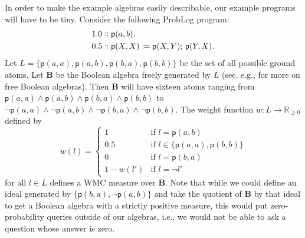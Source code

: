 \documentclass{article}
\theoremstyle{definition}
\theoremstyle{remark}
\begin{document}
In order to make the example algebras easily describable, our example programs
will have to be tiny. Consider the following ProbLog
\cite{DBLP:conf/ijcai/RaedtKT07} program:
\begin{align*}
  1.0 &\dblcolon \mathsf{p}(a, b).\\
  0.5 &\dblcolon \mathsf{p}(X, X) \coloneq \mathsf{p}(X, Y);\, \mathsf{p}(Y, X).
\end{align*}
Let $L = \{ \mathsf{p}(a, a), \mathsf{p}(a, b), \mathsf{p}(b, a), \mathsf{p}(b,
b) \}$ be the set of all possible ground atoms. Let $\mathbf{B}$ be the
Boolean algebra freely generated by $L$ (see, e.g.,
\cite{givant2008introduction} for more on free Boolean algebras). Then
$\mathbf{B}$ will have sixteen atoms ranging from $\mathsf{p}(a, a) \land
\mathsf{p}(a, b) \land \mathsf{p}(b, a) \land \mathsf{p}(b, b)$ to
$\neg\mathsf{p}(a, a) \land \neg\mathsf{p}(a, b) \land \neg\mathsf{p}(b, a)
\land \neg\mathsf{p}(b, b)$. The weight function $w : L \to \mathbb{R}_{\ge 0}$
defined by
\[
  w(l) = \begin{cases}
    1 & \text{if } l = \mathsf{p}(a, b) \\
    0.5 & \text{if } l \in \{ \mathsf{p}(a, a), \mathsf{p}(b, b) \} \\
    0 & \text{if } l = \mathsf{p}(b, a) \\
    1-w(l') & \text{if } l = \neg l'
  \end{cases}
\]
for all $l \in L$ defines a WMC measure over $\mathbf{B}$. Note that while we
could define an ideal generated by $\{ \mathsf{p}(b, a), \neg\mathsf{p}(a, b)
\}$ and take the quotient of $\mathbf{B}$ by that ideal to get a Boolean algebra
with a strictly positive measure, this would put zero-probability queries
outside of our algebras, i.e., we would not be able to ask a question whose
answer is zero.
\end{document}
